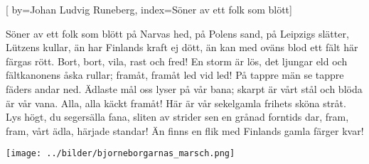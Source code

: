 

[
by={Johan Ludvig Runeberg},
index={Söner av ett folk som blött}]

\beginverse*
Söner av ett folk som blött
på Narvas hed, på Polens sand, på Leipzigs slätter, Lützens kullar,
än har Finlands kraft ej dött,
än kan med oväns blod ett fält här färgas rött.
Bort, bort, vila, rast och fred!
En storm är lös, det ljungar eld och fältkanonens åska rullar;
framåt, framåt led vid led!
På tappre män se tappre fäders andar ned.
Ädlaste mål
oss lyser på vår bana;
skarpt är vårt stål
och blöda är vår vana.
Alla, alla käckt framåt!
Här är vår sekelgamla frihets sköna stråt.
Lys högt, du segersälla fana,
sliten av strider sen en grånad forntids dar,
fram, fram, vårt ädla, härjade standar!
Än finns en flik med Finlands gamla färger kvar!
\endverse
\endsong

\begin{intersong}
	\begin{center}
		\texttt{[image: ../bilder/bjorneborgarnas\_marsch.png]} 
	\end{center}
\end{intersong}